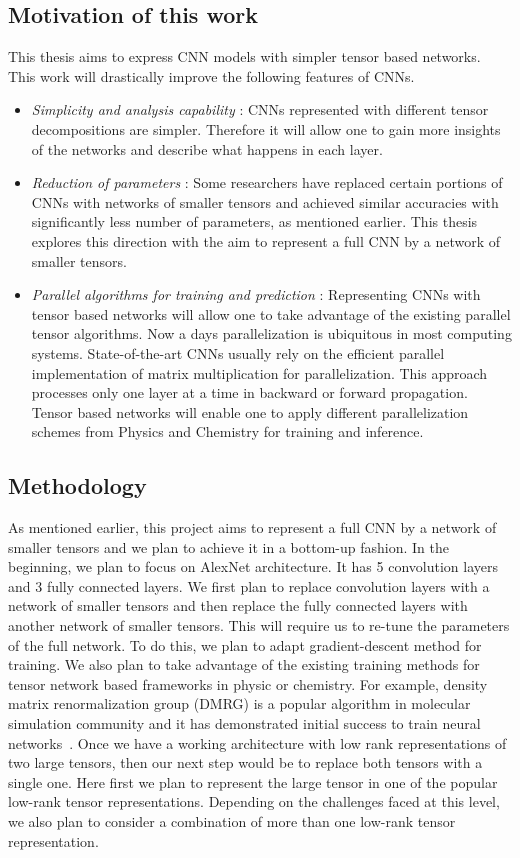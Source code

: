 \documentclass[11pt]{article}
\begin{document}
\subsection*{Motivation of this work}
This thesis aims to express CNN models with simpler tensor based networks.  This work will  drastically improve the following features of CNNs.
\begin{itemize}
	\item \emph{Simplicity and analysis capability} :  CNNs represented with different tensor decompositions are simpler. Therefore it will allow one to gain more insights of the networks and describe what happens in each layer.
	\item \emph{Reduction of parameters} : Some researchers have replaced certain portions of CNNs with  networks of smaller tensors and achieved  similar accuracies with significantly less number of parameters, as mentioned earlier. This thesis explores this direction with the aim to represent a full CNN by a network of smaller tensors. 
	\item \emph{Parallel algorithms for training and prediction} : Representing CNNs with tensor based networks will allow one to take advantage of the existing parallel tensor algorithms. Now a days parallelization is ubiquitous in most computing systems. State-of-the-art CNNs usually rely on the efficient parallel implementation of matrix multiplication for parallelization. This approach processes only one layer at a time in backward or forward propagation. Tensor based networks will enable one to apply different parallelization schemes from Physics and Chemistry for training and inference.
\end{itemize}


\subsection*{Methodology}
As mentioned earlier, this project aims to represent a full CNN by a network of smaller tensors and we plan to achieve it in a bottom-up fashion. In the beginning, we plan to focus on AlexNet architecture. It has 5 convolution layers and 3 fully connected layers. We first plan to replace convolution layers with a network of smaller tensors and then replace the fully connected layers with another network of smaller tensors. This will require us to re-tune the parameters of the full network. To do this, we plan to adapt gradient-descent method for training. We also plan to take advantage of the existing training methods for tensor network based frameworks in physic or chemistry. For example, density matrix renormalization group (DMRG) is a popular algorithm in molecular simulation community and it has demonstrated initial success to train neural networks~\cite{SS-NIPS2016}. Once we have a working architecture with low rank representations of two large tensors, then our next step would be to replace both tensors with a single one. Here first we plan to represent the large tensor in one of the popular low-rank tensor representations. Depending on the challenges faced at this level, we also plan to consider a combination of more than one low-rank tensor representation.    
\end{document}
